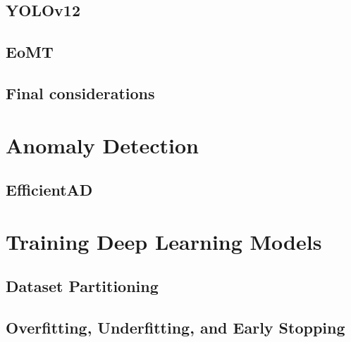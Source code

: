 \subsection{YOLOv12}

\subsection{EoMT}

\subsection{Final considerations}

\section{Anomaly Detection}

\subsection{EfficientAD}

\section{Training Deep Learning Models}

\subsection{Dataset Partitioning}

\subsection{Overfitting, Underfitting, and Early Stopping}





